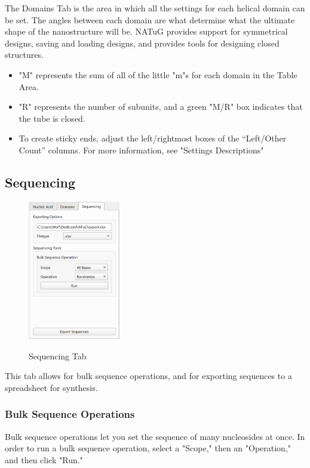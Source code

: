 \documentclass[titlepage]{article}
\begin{document}
	The Domains Tab is the area in which all the settings for each helical domain can be set. The angles between each domain are what determine what the ultimate shape of the nanostructure will be. NATuG provides support for symmetrical designs, saving and loading designs, and provides tools for designing closed structures.
	
	\begin{itemize}
		\item "M" represents the sum of all of the little "m"s for each domain in the Table Area.
		\item "R" represents the number of subunits, and a green "M/R" box indicates that the tube is closed.
		\item To create sticky ends, adjust the left/rightmost boxes of the “Left/Other Count” columns. For more information, see "Settings Descriptions"
	\end{itemize}
	
	\subsection{Sequencing}
	
	\begin{figure}
		\centering
		\caption{Sequencing Tab}
		\includegraphics[height=2.4in]{sequencing-tab.png}
		\label{fig:sequencing-tab}
	\end{figure}
	
	This tab allows for bulk sequence operations, and for exporting sequences to a spreadsheet for synthesis.
	
	\subsubsection{Bulk Sequence Operations}
	Bulk sequence operations let you set the sequence of many nucleosides at once. In order to run a bulk sequence operation, select a "Scope," then an "Operation," and then click "Run."
	
\end{document}
